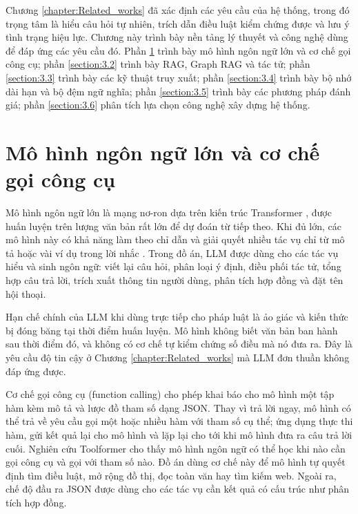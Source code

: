 \documentclass[../DoAn.tex]{subfiles}
\begin{document}
Chương \ref{chapter:Related_works} đã xác định các yêu cầu của hệ thống, trong đó trọng tâm là hiểu câu hỏi tự nhiên, trích dẫn điều luật kiểm chứng được và lưu ý tình trạng hiệu lực. Chương này trình bày nền tảng lý thuyết và công nghệ dùng để đáp ứng các yêu cầu đó. Phần \ref{section:3.1} trình bày mô hình ngôn ngữ lớn và cơ chế gọi công cụ; phần \ref{section:3.2} trình bày RAG, Graph RAG và tác tử; phần \ref{section:3.3} trình bày các kỹ thuật truy xuất; phần \ref{section:3.4} trình bày bộ nhớ dài hạn và bộ đệm ngữ nghĩa; phần \ref{section:3.5} trình bày các phương pháp đánh giá; phần \ref{section:3.6} phân tích lựa chọn công nghệ xây dựng hệ thống.

\section{Mô hình ngôn ngữ lớn và cơ chế gọi công cụ}
\label{section:3.1}
Mô hình ngôn ngữ lớn là mạng nơ-ron dựa trên kiến trúc Transformer \cite{vaswani2017attention}, được huấn luyện trên lượng văn bản rất lớn để dự đoán từ tiếp theo. Khi đủ lớn, các mô hình này có khả năng làm theo chỉ dẫn và giải quyết nhiều tác vụ chỉ từ mô tả hoặc vài ví dụ trong lời nhắc \cite{brown2020gpt3}. Trong đồ án, LLM được dùng cho các tác vụ hiểu và sinh ngôn ngữ: viết lại câu hỏi, phân loại ý định, điều phối tác tử, tổng hợp câu trả lời, trích xuất thông tin người dùng, phân tích hợp đồng và đặt tên hội thoại.

Hạn chế chính của LLM khi dùng trực tiếp cho pháp luật là ảo giác \cite{ji2023hallucination} và kiến thức bị đóng băng tại thời điểm huấn luyện. Mô hình không biết văn bản ban hành sau thời điểm đó, và không có cơ chế tự kiểm chứng số điều mà nó đưa ra. Đây là yêu cầu độ tin cậy ở Chương \ref{chapter:Related_works} mà LLM đơn thuần không đáp ứng được.

Cơ chế gọi công cụ (function calling) \cite{openaifunction} cho phép khai báo cho mô hình một tập hàm kèm mô tả và lược đồ tham số dạng JSON. Thay vì trả lời ngay, mô hình có thể trả về yêu cầu gọi một hoặc nhiều hàm với tham số cụ thể; ứng dụng thực thi hàm, gửi kết quả lại cho mô hình và lặp lại cho tới khi mô hình đưa ra câu trả lời cuối. Nghiên cứu Toolformer \cite{schick2023toolformer} cho thấy mô hình ngôn ngữ có thể học khi nào cần gọi công cụ và gọi với tham số nào. Đồ án dùng cơ chế này để mô hình tự quyết định tìm điều luật, mở rộng đồ thị, đọc toàn văn hay tìm kiếm web. Ngoài ra, chế độ đầu ra JSON được dùng cho các tác vụ cần kết quả có cấu trúc như phân tích hợp đồng.
\end{document}
